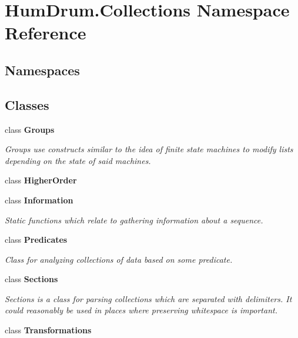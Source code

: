 \hypertarget{namespaceHumDrum_1_1Collections}{}\section{Hum\+Drum.\+Collections Namespace Reference}
\label{namespaceHumDrum_1_1Collections}
\subsection*{Namespaces}
\begin{DoxyCompactItemize}
\end{DoxyCompactItemize}
\subsection*{Classes}
\begin{DoxyCompactItemize}
\item 
class {\bfseries Groups}
\begin{DoxyCompactList}\small\item\em Groups use constructs similar to the idea of finite state machines to modify lists depending on the state of said machines. \end{DoxyCompactList}\item 
class {\bfseries Higher\+Order}
\item 
class {\bfseries Information}
\begin{DoxyCompactList}\small\item\em Static functions which relate to gathering information about a sequence. \end{DoxyCompactList}\item 
class {\bfseries Predicates}
\begin{DoxyCompactList}\small\item\em Class for analyzing collections of data based on some predicate. \end{DoxyCompactList}\item 
class {\bfseries Sections}
\begin{DoxyCompactList}\small\item\em Sections is a class for parsing collections which are separated with delimiters. It could reasonably be used in places where preserving whitespace is important. \end{DoxyCompactList}\item 
class {\bfseries Transformations}
\end{DoxyCompactItemize}
